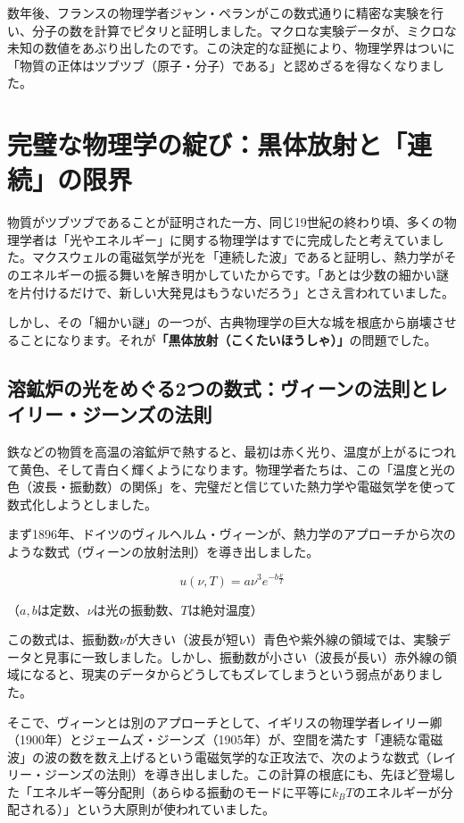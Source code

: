 数年後、フランスの物理学者ジャン・ペランがこの数式通りに精密な実験を行い、分子の数を計算でピタリと証明しました。マクロな実験データが、ミクロな未知の数値をあぶり出したのです。この決定的な証拠により、物理学界はついに「物質の正体はツブツブ（原子・分子）である」と認めざるを得なくなりました。

\section{完璧な物理学の綻び：黒体放射と「連続」の限界}

物質がツブツブであることが証明された一方、同じ19世紀の終わり頃、多くの物理学者は「光やエネルギー」に関する物理学はすでに完成したと考えていました。マクスウェルの電磁気学が光を「連続した波」であると証明し、熱力学がそのエネルギーの振る舞いを解き明かしていたからです。「あとは少数の細かい謎を片付けるだけで、新しい大発見はもうないだろう」とさえ言われていました。

しかし、その「細かい謎」の一つが、古典物理学の巨大な城を根底から崩壊させることになります。それが\textbf{「黒体放射（こくたいほうしゃ）」}の問題でした。

\subsection{溶鉱炉の光をめぐる2つの数式：ヴィーンの法則とレイリー・ジーンズの法則}

鉄などの物質を高温の溶鉱炉で熱すると、最初は赤く光り、温度が上がるにつれて黄色、そして青白く輝くようになります。物理学者たちは、この「温度と光の色（波長・振動数）の関係」を、完璧だと信じていた熱力学や電磁気学を使って数式化しようとしました。

まず1896年、ドイツのヴィルヘルム・ヴィーンが、熱力学のアプローチから次のような数式（ヴィーンの放射法則）を導き出しました。

\[u(\nu, T) = a \nu^3 e^{-b\frac{\nu}{T}}\]

（\(a, b\)は定数、\(\nu\)は光の振動数、\(T\)は絶対温度）

この数式は、振動数\(\nu\)が大きい（波長が短い）青色や紫外線の領域では、実験データと見事に一致しました。しかし、振動数が小さい（波長が長い）赤外線の領域になると、現実のデータからどうしてもズレてしまうという弱点がありました。

そこで、ヴィーンとは別のアプローチとして、イギリスの物理学者レイリー卿（1900年）とジェームズ・ジーンズ（1905年）が、空間を満たす「連続な電磁波」の波の数を数え上げるという電磁気学的な正攻法で、次のような数式（レイリー・ジーンズの法則）を導き出しました。この計算の根底にも、先ほど登場した「エネルギー等分配則（あらゆる振動のモードに平等に\(k_B T\)のエネルギーが分配される）」という大原則が使われていました。

